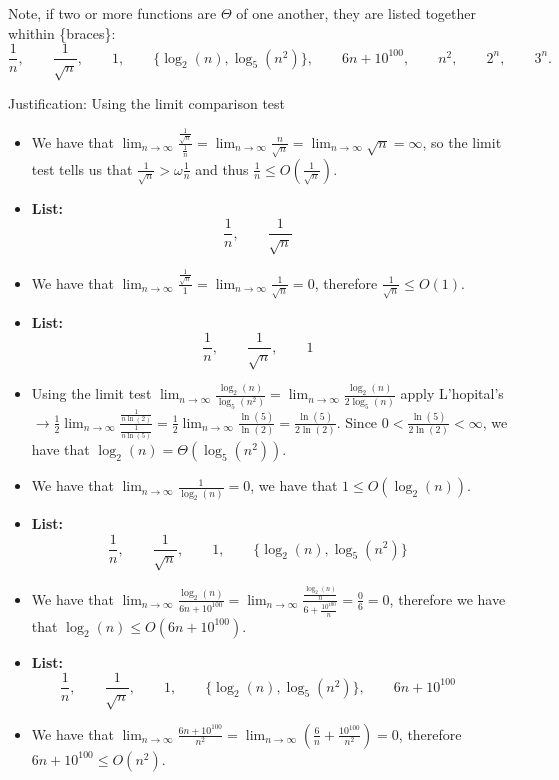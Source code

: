 \documentclass[9pt]{article}
\begin{document}
Note, if two or more functions are $\Theta$ of one another, they are listed together whithin \{braces\}:
	\[
	\frac{1}{n}, \qquad
	\frac{1}{\sqrt{n}}, \qquad
	1, \qquad 
	\{\log_2(n),
	\log_5(n^2)\}, \qquad
	6n+10^{100}, \qquad
	n^2, \qquad
	2^n, \qquad
	3^n.
	\]

Justification:
Using the limit comparison test
\begin{itemize}
	\item We have that $\lim_{n \to \infty} \frac{\frac{1}{\sqrt{n}}}{\frac{1}{n}} = \lim_{n \to \infty} \frac{n}{\sqrt{n}} = \lim_{n \to \infty} \sqrt{n} = \infty$, so the limit test tells us that $\frac{1}{\sqrt{n}} > \omega\frac{1}{n}$ and thus $\frac{1}{n} \le O(\frac{1}{\sqrt{n}})$.
	\item \textbf{List:} $$
		\frac{1}{n}, \qquad
		\frac{1}{\sqrt{n}} \qquad$$
	\item We have that  $\lim_{n \to \infty} \frac{\frac{1}{\sqrt{n}}}{1} = \lim_{n \to \infty} \frac{1}{\sqrt{n}} = 0$, therefore $\frac{1}{\sqrt{n}} \le O(1)$.
	\item \textbf{List:} $$
	\frac{1}{n}, \qquad
	\frac{1}{\sqrt{n}}, \qquad
	1 \qquad 
	$$
	\item Using the limit test $\lim_{n \to \infty} \frac{\log_2(n)}{\log_5(n^2)} = \lim_{n \to \infty} \frac{\log_2(n)}{2\log_5(n)}$ apply L'hopital's $\rightarrow \frac{1}{2}\lim_{n \to \infty} \frac{\frac{1}{n\ln(2)}}{\frac{1}{n\ln(5)}} = \frac{1}{2}\lim_{n \to \infty} \frac{\ln(5)}{\ln(2)} = \frac{\ln(5)}{2\ln(2)}$. Since $0 < \frac{\ln(5)}{2\ln(2)} < \infty$, we have that $\log_2(n) = \Theta(\log_5(n^2))$. 
	\item We have that $\lim_{n \to \infty} \frac{1}{\log_2(n)} = 0$, we have that $1 \le O(\log_2(n))$.
	\item \textbf{List:} $$
	\frac{1}{n}, \qquad
	\frac{1}{\sqrt{n}}, \qquad
	1, \qquad 
	\{\log_2(n),
	\log_5(n^2)\} \qquad
	$$
	\newpage
	\item We have that $\lim_{n \to \infty} \frac{\log_2(n)}{6n+10^{100}} = \lim_{n \to \infty} \frac{\frac{\log_2(n)}{n}}{6+\frac{10^{100}}{n}} = \frac{0}{6} = 0$, therefore we have that $\log_2(n) \le O(6n+10^{100})$.
	\item \textbf{List:} $$
	\frac{1}{n}, \qquad
	\frac{1}{\sqrt{n}}, \qquad
	1, \qquad 
	\{\log_2(n),
	\log_5(n^2)\}, \qquad
	6n+10^{100} \qquad
	$$
	\item We have that $\lim_{n \to \infty} \frac{6n+10^{100}}{n^2} = \lim_{n \to \infty} \left(\frac{6}{n}+\frac{10^{100}}{n^2}\right) = 0$, therefore $6n+10^{100} \le O(n^2)$.

\end{itemize}
\end{document}
